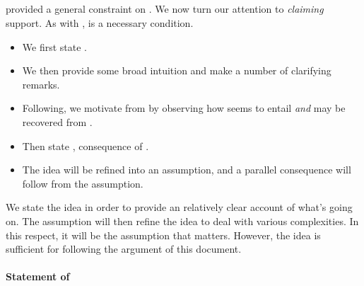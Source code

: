 

\subsection{}
\label{sec:ideaCS}

\begin{note}
  \ideaS{} provided a general constraint on \support{}.
  We now turn our attention to \emph{claiming} support.
  As with \ideaS{}, \ideaCS{} is a necessary condition.

  \begin{itemize}
  \item We first state \ideaCS{}.
  \item We then provide some broad intuition and make a number of clarifying remarks.
  \item Following, we motivate \ideaCS{} from \ideaS{} by observing how \ideaS{} seems to entail \ideaCS{} \emph{and} \ideaS{} may be recovered from \ideaCS{}.
  \item Then state \ideaCSC{}, consequence of \ideaCS{}.
  \item The idea will be refined into an assumption, and a parallel consequence will follow from the assumption.
  \end{itemize}

  We state the idea in order to provide an relatively clear account of what's going on.
  The assumption will then refine the idea to deal with various complexities.
  In this respect, it will be the assumption that matters.
  However, the idea is sufficient for following the argument of this document.
\end{note}

\paragraph{Statement of \ideaCS{}}

